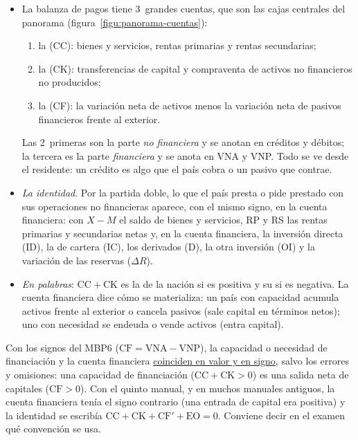 \documentclass[11pt]{article}
\begin{document}
\begin{itemize}
\item La balanza de pagos tiene 3~grandes cuentas, que son las cajas centrales del panorama (figura~\ref{figu:panorama-cuentas})\nocite{FMI2009MBP6}:
  \begin{enumerate}
  \item la  (CC): bienes y servicios, rentas primarias y rentas secundarias;
  \item la  (CK): transferencias de capital y compraventa de activos no financieros no producidos;
  \item la  (CF): la variación neta de activos menos la variación neta de pasivos financieros frente al exterior.
  \end{enumerate}
  Las 2~primeras son la parte \emph{no financiera} y se anotan en créditos y débitos; la tercera es la parte \emph{financiera} y se anota en VNA y VNP. Todo se ve desde el residente: un crédito es algo que el país cobra o un pasivo que contrae.
\item \emph{La identidad}. Por la partida doble, lo que el país presta o pide prestado con sus operaciones no financieras aparece, con el mismo signo, en la cuenta financiera:
con $X-M$ el saldo de bienes y servicios, RP y RS las rentas primarias y secundarias netas y, en la cuenta financiera, la inversión directa (ID), la de cartera (IC), los derivados (D), la otra inversión (OI) y la variación de las reservas ($\Delta R$).
\item \emph{En palabras}: $\mathrm{CC}+\mathrm{CK}$ es la  de la nación si es positiva y su  si es negativa. La cuenta financiera dice cómo se materializa: un país con capacidad acumula activos frente al exterior o cancela pasivos (sale capital en términos netos); uno con necesidad se endeuda o vende activos (entra capital).
\end{itemize}

\begin{notaopositor}
Con los signos del MBP6 ($\mathrm{CF}=\mathrm{VNA}-\mathrm{VNP}$), la capacidad o necesidad de financiación y la cuenta financiera \uline{coinciden en valor y en signo}, salvo los errores y omisiones: una capacidad de financiación ($\mathrm{CC}+\mathrm{CK}>0$) es una salida neta de capitales ($\mathrm{CF}>0$). Con el quinto manual, y en muchos manuales antiguos, la cuenta financiera tenía el signo contrario (una entrada de capital era positiva) y la identidad se escribía $\mathrm{CC}+\mathrm{CK}+\mathrm{CF}'+\mathrm{EO}=0$. Conviene decir en el examen qué convención se usa.
\end{notaopositor}
\end{document}
